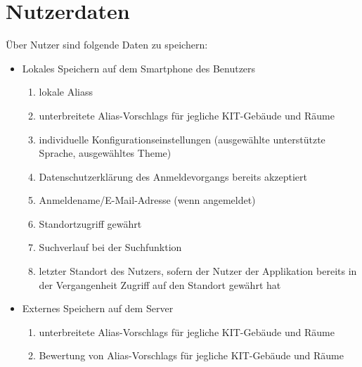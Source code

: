 \section{Nutzerdaten}

Über Nutzer sind folgende Daten zu speichern:
\begin{itemize}
	\item Lokales Speichern auf dem Smartphone des \Gls{Benutzer}s
	\begin{enumerate}[label=\textbf{/D\arabic*0/}, align=left]
		\item \gls{lokal}e \Glspl{Alias}
		\item unterbreitete \Glspl{Alias-Vorschlag} für jegliche \Gls{KIT}-Gebäude und Räume
		\item individuelle Konfigurationseinstellungen (ausgewählte unterstützte Sprache, ausgewähltes \Gls{Theme})
		\item Datenschutzerklärung des Anmeldevorgangs bereits akzeptiert
		\item Anmeldename/E-Mail-Adresse (wenn angemeldet)
		\item Standortzugriff gewährt
		\item Suchverlauf bei der Suchfunktion
		\item letzter Standort des Nutzers, sofern der Nutzer der Applikation bereits in der Vergangenheit Zugriff auf den Standort gewährt hat
	\end{enumerate}
	\item Externes Speichern auf dem Server
	\begin{enumerate}[label=\textbf{/D\arabic*0/}, align=left, resume]
		\item unterbreitete \Glspl{Alias-Vorschlag} für jegliche \Gls{KIT}-Gebäude und Räume
		\item Bewertung von \Glspl{Alias-Vorschlag} für jegliche \Gls{KIT}-Gebäude und Räume
		\setcounter{user_data_end}{\value{enumi}}
	\end{enumerate}
\end{itemize}